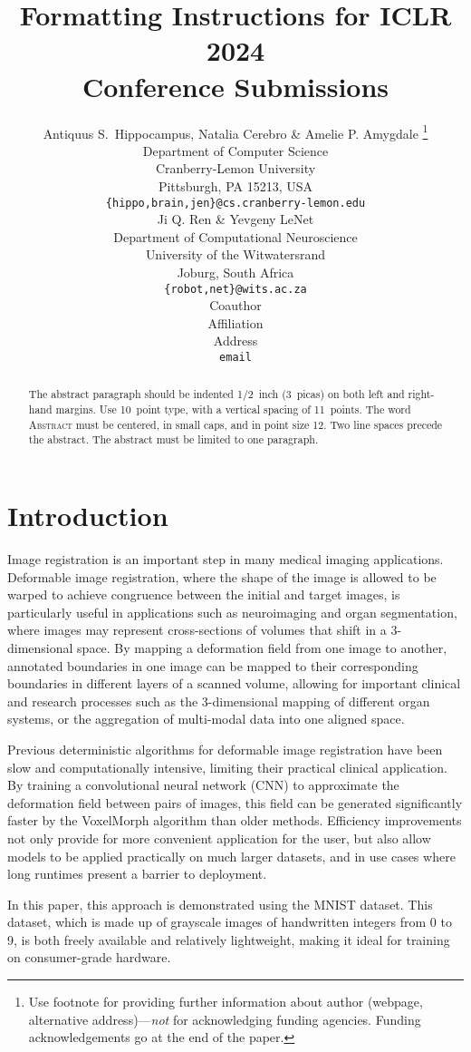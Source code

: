 \documentclass{article} %
\title{Formatting Instructions for ICLR 2024 \\ Conference Submissions}
\author{Antiquus S.~Hippocampus, Natalia Cerebro \& Amelie P. Amygdale \thanks{ Use footnote for providing further information
about author (webpage, alternative address)---\emph{not} for acknowledging
funding agencies.  Funding acknowledgements go at the end of the paper.} \\
Department of Computer Science\\
Cranberry-Lemon University\\
Pittsburgh, PA 15213, USA \\
\texttt{\{hippo,brain,jen\}@cs.cranberry-lemon.edu} \\
\And
Ji Q. Ren \& Yevgeny LeNet \\
Department of Computational Neuroscience \\
University of the Witwatersrand \\
Joburg, South Africa \\
\texttt{\{robot,net\}@wits.ac.za} \\
\AND
Coauthor \\
Affiliation \\
Address \\
\texttt{email}
}
\begin{document}
\maketitle

\begin{abstract}
The abstract paragraph should be indented 1/2~inch (3~picas) on both left and
right-hand margins. Use 10~point type, with a vertical spacing of 11~points.
The word \textsc{Abstract} must be centered, in small caps, and in point size 12. Two
line spaces precede the abstract. The abstract must be limited to one
paragraph. 

\end{abstract}

\section{Introduction}
Image registration is an important step in many medical imaging applications. Deformable image registration, where the shape of the image is allowed to be warped to achieve congruence between the initial and target images, is particularly useful in applications such as neuroimaging and organ segmentation, where images may represent cross-sections of volumes that shift in a 3-dimensional space. By mapping a deformation field from one image to another, annotated boundaries in one image can be mapped to their corresponding boundaries in different layers of a scanned volume, allowing for important clinical and research processes such as the 3-dimensional mapping of different organ systems, or the aggregation of multi-modal data into one aligned space.

Previous deterministic algorithms for deformable image registration have been slow and computationally intensive, limiting their practical clinical application. By training a convolutional neural network (CNN) to approximate the deformation field between pairs of images, this field can be generated significantly faster by the VoxelMorph algorithm than older methods. Efficiency improvements not only provide for more convenient application for the user, but also allow models to be applied practically on much larger datasets, and in use cases where long runtimes present a barrier to deployment. 

In this paper, this approach is demonstrated using the MNIST dataset. This dataset, which is made up of 
grayscale images of handwritten integers from 0 to 9, is both freely available and relatively lightweight, making it ideal for training on consumer-grade hardware. 
\end{document}
